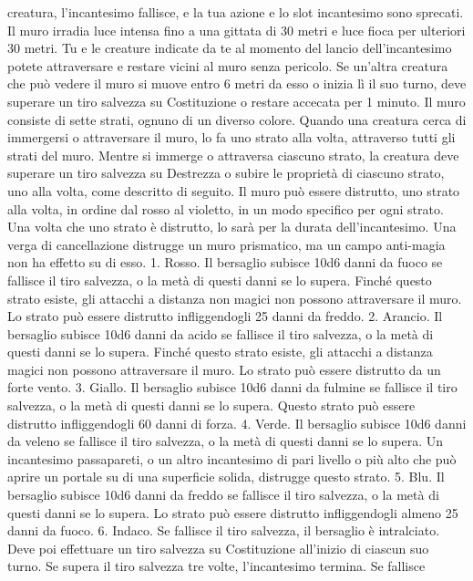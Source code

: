 \begin{multicols}{2}
creatura, l’incantesimo fallisce, e la tua azione e lo slot
incantesimo sono sprecati.
Il muro irradia luce intensa fino a una gittata di 30 metri
e luce fioca per ulteriori 30 metri. Tu e le creature
indicate da te al momento del lancio dell’incantesimo
potete attraversare e restare vicini al muro senza
pericolo. Se un’altra creatura che può vedere il muro si
muove entro 6 metri da esso o inizia lì il suo turno, deve
superare un tiro salvezza su Costituzione o restare
accecata per 1 minuto.
Il muro consiste di sette strati, ognuno di un diverso
colore. Quando una creatura cerca di immergersi o
attraversare il muro, lo fa uno strato alla volta,
attraverso tutti gli strati del muro. Mentre si immerge o
attraversa ciascuno strato, la creatura deve superare un
tiro salvezza su Destrezza o subire le proprietà di
ciascuno strato, uno alla volta, come descritto di
seguito.
Il muro può essere distrutto, uno strato alla volta, in
ordine dal rosso al violetto, in un modo specifico per
ogni strato. Una volta che uno strato è distrutto, lo sarà
per la durata dell’incantesimo. Una verga di
cancellazione distrugge un muro prismatico, ma un
campo anti-magia non ha effetto su di esso.
1. Rosso. Il bersaglio subisce 10d6 danni da fuoco se
fallisce il tiro salvezza, o la metà di questi danni se lo
supera. Finché questo strato esiste, gli attacchi a
distanza non magici non possono attraversare il muro. 
Lo strato può essere distrutto infliggendogli 25 danni da
freddo.
2. Arancio. Il bersaglio subisce 10d6 danni da acido se
fallisce il tiro salvezza, o la metà di questi danni se lo
supera. Finché questo strato esiste, gli attacchi a
distanza magici non possono attraversare il muro. Lo
strato può essere distrutto da un forte vento.
3. Giallo. Il bersaglio subisce 10d6 danni da fulmine se
fallisce il tiro salvezza, o la metà di questi danni se lo
supera. Questo strato può essere distrutto infliggendogli
60 danni di forza.
4. Verde. Il bersaglio subisce 10d6 danni da veleno se
fallisce il tiro salvezza, o la metà di questi danni se lo
supera. Un incantesimo passapareti, o un altro
incantesimo di pari livello o più alto che può aprire un
portale su di una superficie solida, distrugge questo
strato.
5. Blu. Il bersaglio subisce 10d6 danni da freddo se
fallisce il tiro salvezza, o la metà di questi danni se lo
supera. Lo strato può essere distrutto infliggendogli
almeno 25 danni da fuoco.
6. Indaco. Se fallisce il tiro salvezza, il bersaglio è
intralciato. Deve poi effettuare un tiro salvezza su
Costituzione all’inizio di ciascun suo turno. Se supera il
tiro salvezza tre volte, l’incantesimo termina. Se fallisce

\end{multicols}
